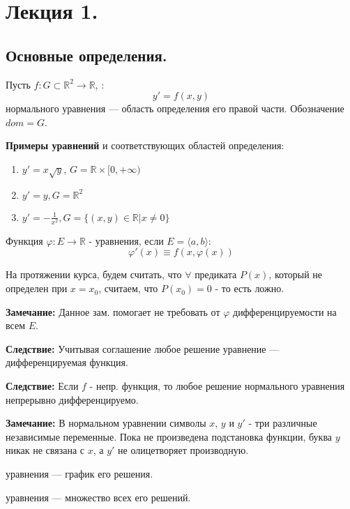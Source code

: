 \section{Лекция 1.}

\subsection{Основные определения.}

 Пусть $f:  G \subset \mathbb{R}^2 \rightarrow \mathbb{R}$,  :
$$y' = f(x,y)$$
  нормального уравнения --- область определения его правой части. Обозначение $dom = G$.

\textbf{Примеры уравнений} и соответствующих областей определения:

\begin{enumerate}
    \item $y' = x\sqrt{y}$, $G = \mathbb{R} \times [0, + \infty)$
    \item $y' = y, G  = \mathbb{R}^2$
    \item $y' =  -\frac{1}{x^2}, G = \{(x,y)\in \mathbb{R} | x \neq 0\}$
\end{enumerate}

 Функция $\varphi : E \rightarrow \mathbb{R}$ -  уравнения, если $E = \langle a,b\rangle$:
$$\varphi'(x) \equiv f(x, \varphi(x))$$

 На протяжении курса, будем считать, что $\forall$ предиката $P(x)$, который не определен при $x = x_0$, считаем, что $P(x_0) = 0$ - то есть ложно. 

\textbf{Замечание:} Данное зам. помогает не требовать от $\varphi$ дифференцируемости на всем $E$.


\textbf{Следствие:} Учитывая соглашение любое решение уравнение --- дифференцируемая функция.

\textbf{Следствие:} Если $f$ - непр. функция, то любое решение нормального уравнения непрерывно дифференцируемо.


\textbf{Замечание:} В нормальном уравнении символы $x$, $y$ и $y'$ - три различные независимые переменные. Пока не произведена подстановка функции, буква $y$ никак не связана с $x$, а $y'$ не олицетворяет производную.

  уравнения --- график его решения.

  уравнения --- множество всех его решений.

